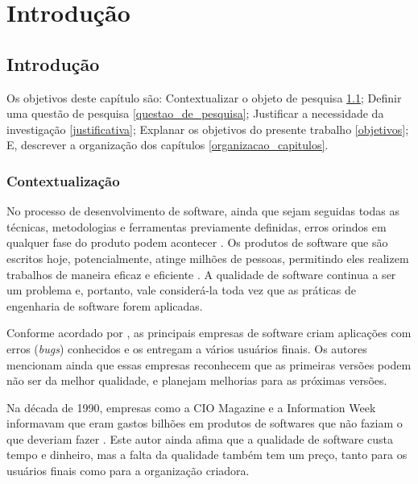 \part{Introdução}

\chapter{Introdução}

Os objetivos deste capítulo são: Contextualizar o objeto de pesquisa \ref{contextualizacao}; Definir uma questão de pesquisa \ref{questao_de_pesquisa}; Justificar a necessidade da investigação \ref{justificativa}; Explanar os objetivos do presente trabalho \ref{objetivos}; E, descrever a organização dos capítulos \ref{organizacao_capitulos}. 

\section[Contextualizacao]{Contextualização}
\label{contextualizacao}

No processo de desenvolvimento de software, ainda que sejam seguidas todas as técnicas, metodologias e ferramentas previamente definidas, erros orindos em qualquer fase do produto podem acontecer \cite{maldonado_introducao_2004}. Os produtos de software que são escritos hoje, potencialmente, atinge milhões de pessoas, permitindo eles realizem trabalhos de maneira eficaz e eficiente \cite{myers2011art}. A qualidade de software continua a ser um problema e, portanto, vale considerá-la toda vez que as práticas de engenharia de software forem aplicadas. \cite{pressman_engenharia_2016}

Conforme acordado por \cite{pressman_engenharia_2016}, as principais empresas de software criam aplicações com erros (\textit{bugs}) conhecidos e os entregam a vários usuários finais. Os autores mencionam ainda que essas empresas reconhecem que as primeiras versões podem não ser da melhor qualidade, e planejam melhorias para as próximas versões.

Na década de 1990, empresas como a CIO Magazine e a Information Week informavam que eram gastos bilhões em produtos de softwares que não faziam o que deveriam fazer \cite{pressman_engenharia_2016}. Este autor ainda afima que a qualidade de software custa tempo e dinheiro, mas a falta da qualidade também tem um preço, tanto para os usuários finais como para a organização criadora.

